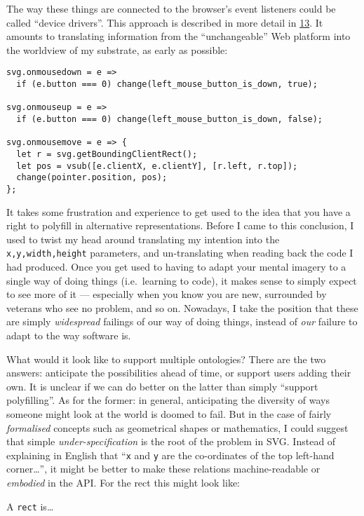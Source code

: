 The way these things are connected to the browser's event listeners
could be called ``device drivers''. This approach is described in more
detail in \href{https://prog21.dadgum.com/66.html}{13}. It amounts to
translating information from the ``unchangeable'' Web platform into the
worldview of my substrate, as early as possible:

\begin{lstlisting}
svg.onmousedown = e =>
  if (e.button === 0) change(left_mouse_button_is_down, true);

svg.onmouseup = e =>
  if (e.button === 0) change(left_mouse_button_is_down, false);

svg.onmousemove = e => {
  let r = svg.getBoundingClientRect();
  let pos = vsub([e.clientX, e.clientY], [r.left, r.top]);
  change(pointer.position, pos);
};
\end{lstlisting}

It takes some frustration and experience to get used to the idea that
you have a right to polyfill in alternative representations. Before I
came to this conclusion, I used to twist my head around translating my
intention into the \texttt{x,y,width,height} parameters, and
un-translating when reading back the code I had produced. Once you get
used to having to adapt your mental imagery to a single way of doing
things (i.e.~learning to code), it makes sense to simply expect to see
more of it --- especially when you know you are new, surrounded by
veterans who see no problem, and so on. Nowadays, I take the position
that these are simply \emph{widespread} failings of our way of doing
things, instead of \emph{our} failure to adapt to the way software is.

What would it look like to support multiple ontologies? There are the
two answers: anticipate the possibilities ahead of time, or support
users adding their own. It is unclear if we can do better on the latter
than simply ``support polyfilling''. As for the former: in general,
anticipating the diversity of ways someone might look at the world is
doomed to fail. But in the case of fairly \emph{formalised} concepts
such as geometrical shapes or mathematics, I could suggest that simple
\emph{under-specification} is the root of the problem in SVG. Instead of
explaining in English that ``\texttt{x} and \texttt{y} are the
co-ordinates of the top left-hand corner\ldots{}'', it might be better
to make these relations machine-readable or \emph{embodied} in the API.
For the rect this might look like:

\noindent A \texttt{rect} is\ldots{}

